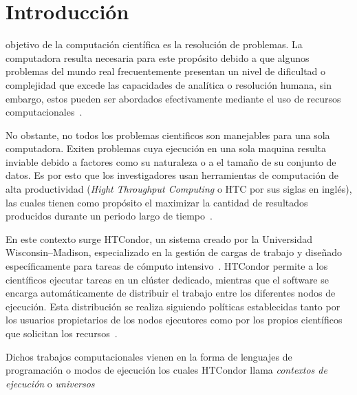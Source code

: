 \section{Introducción}
 objetivo de la computación científica es la resolución
de problemas. La computadora resulta necesaria para este propósito debido a
que algunos problemas del mundo real frecuentemente presentan un nivel de dificultad
o complejidad que excede las capacidades de analítica o resolución humana, sin embargo,
estos pueden ser abordados efectivamente mediante el uso
de recursos computacionales~\cite{landau01}.


No obstante, no todos los problemas cientificos son
manejables para una sola computadora. Exiten problemas cuya ejecución en una sola maquina resulta
inviable debido a factores como su naturaleza o a el tamaño de su conjunto de datos. Es por esto
que los investigadores usan herramientas de computación de alta productividad
(\textit{Hight Throughput Computing} o HTC por sus siglas en inglés), las cuales tienen como
propósito el maximizar la cantidad de resultados producidos durante un periodo
largo de tiempo~\cite{juve-01}.

En este contexto surge HTCondor, un sistema creado por la
Universidad Wisconsin–Madison, especializado en la gestión de cargas
de trabajo y diseñado específicamente para tareas de cómputo intensivo~\cite{chang-01, htcondor-description}.
HTCondor permite a los científicos ejecutar tareas en un clúster dedicado, mientras que el
software se encarga automáticamente de distribuir el trabajo entre los diferentes
nodos de ejecución. Esta distribución se realiza siguiendo políticas establecidas
tanto por los usuarios propietarios de los nodos ejecutores como por los
propios científicos que solicitan los recursos~\cite{htcondor-description}.

Dichos trabajos computacionales vienen en la forma de lenguajes de programación
o modos de ejecución los cuales HTCondor llama \textit{contextos de ejecución}
o \textit{universos} 